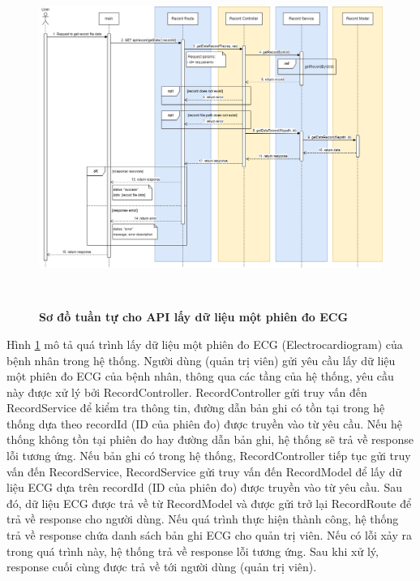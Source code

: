  \begin{figure}[H]
  \centering
  \includegraphics[width=16cm,height=11cm]{Images/sequence_api/getRecordDataById.png}
  \caption[Sơ đồ tuần tự cho API lấy dữ liệu một phiên đo ECG ]{\bfseries \fontsize{12pt}{0pt}
  \selectfont Sơ đồ tuần tự cho API lấy dữ liệu một phiên đo ECG }
  \label{getRecordDataById} %
\end{figure}
Hình \ref{getRecordDataById} mô tả quá trình lấy dữ liệu một phiên đo ECG (Electrocardiogram) của bệnh nhân trong hệ thống. Người dùng (quản trị viên) gửi yêu cầu lấy dữ liệu một phiên đo ECG của bệnh nhân, thông qua các tầng của hệ thống, 
yêu cầu này được xử lý bởi RecordController. RecordController gửi truy vấn đến RecordService để kiểm tra thông tin, đường dẫn bản ghi có tồn tại trong hệ thống dựa theo recordId (ID của phiên đo) được truyền vào từ yêu cầu. Nếu hệ thống không tồn tại phiên đo hay đường dẫn bản ghi, hệ thống sẽ
trả về response lỗi tương ứng. Nếu bản ghi có trong hệ thống, RecordController tiếp tục gửi truy vấn đến RecordService, RecordService gửi truy vấn đến RecordModel để lấy dữ liệu ECG dựa trên recordId (ID của phiên đo) được truyền vào từ yêu cầu. 
Sau đó, dữ liệu ECG được trả về từ RecordModel và được gửi trở lại RecordRoute để trả về response cho người dùng. Nếu quá trình thực hiện thành công, hệ thống trả về response chứa danh sách bản ghi ECG cho quản trị viên. Nếu có lỗi xảy ra
 trong quá trình này, hệ thống trả về response lỗi tương ứng. Sau khi xử lý, response cuối cùng được trả về tới người dùng (quản trị viên).


